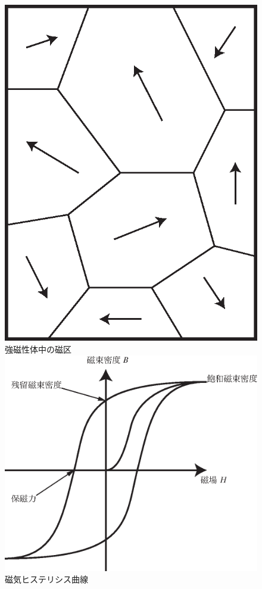 \begin{figure}
\vspace*{-0.8cm}
\begin{center}
\includegraphics[scale=0.3]{06_Magnetism/MagneticDomain.eps}\\
強磁性体中の磁区\\
\vspace*{0.5cm}
\includegraphics[scale=0.5]{06_Magnetism/hysteresis.eps}\\
磁気ヒステリシス曲線
\end{center}
\end{figure}


